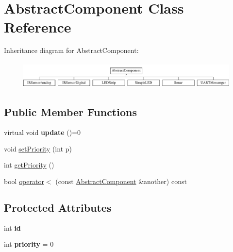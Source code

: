 \hypertarget{class_abstract_component}{}\section{Abstract\+Component Class Reference}
\label{class_abstract_component}
Inheritance diagram for Abstract\+Component\+:\begin{figure}[H]
\begin{center}
\leavevmode
\includegraphics[height=1.435897cm]{class_abstract_component}
\end{center}
\end{figure}
\subsection*{Public Member Functions}
\begin{DoxyCompactItemize}
\item 
\mbox{\label{class_abstract_component_af25a90b8ab213762221c3b358d9873f3}} 
virtual void {\bfseries update} ()=0
\item 
void \hyperlink{class_abstract_component_a58a59a9ea6c3b4c86fb3bf98ff1eaaef}{set\+Priority} (int p)
\item 
int \hyperlink{class_abstract_component_ac0b440d1d642ff1292ec3c544d75a8f1}{get\+Priority} ()
\item 
bool \hyperlink{class_abstract_component_a0c2e458144111c5f599c66f168516abc}{operator$<$} (const \hyperlink{class_abstract_component}{Abstract\+Component} \&another) const
\end{DoxyCompactItemize}
\subsection*{Protected Attributes}
\begin{DoxyCompactItemize}
\item 
\mbox{\label{class_abstract_component_a9c9c548149681b1a1dd935e66ed5dd11}} 
int {\bfseries id}
\item 
\mbox{\label{class_abstract_component_aff57dfa5f31be093a06b55560e33fb95}} 
int {\bfseries priority} = 0
\end{DoxyCompactItemize}
